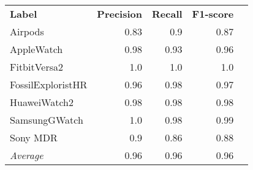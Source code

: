 \begin{tabular}{lrrrr}
    \textbf{Label} & \textbf{Precision} & \textbf{Recall} & \textbf{F1-score} \\
    Airpods & 0.83 & 0.9 & 0.87 \\
    AppleWatch & 0.98 & 0.93 & 0.96 \\
    FitbitVersa2 & 1.0 & 1.0 & 1.0 \\
    FossilExploristHR & 0.96 & 0.98 & 0.97 \\
    HuaweiWatch2 & 0.98 & 0.98 & 0.98 \\
    SamsungGWatch & 1.0 & 0.98 & 0.99 \\
    Sony MDR & 0.9 & 0.86 & 0.88 \\
    \emph{Average} & 0.96 & 0.96 & 0.96 \\
\end{tabular}